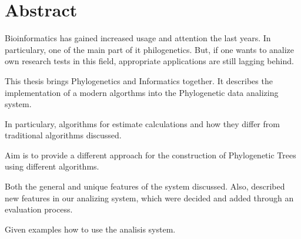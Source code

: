 \chapter*{Abstract} 
Bioinformatics has gained increased usage and attention the last years.
In particulary, one of the main part of it philogenetics. 
But, if one wants to analize own research tests in this field, appropriate applications 
are still lagging behind.

This thesis brings Phylogenetics and Informatics together. 
It describes the implementation of a modern algorthms
into the Phylogenetic data analizing system. 

In particulary, algorithms for estimate calculations \cite{kamilov} and how they
differ from traditional algorithms discussed.

Aim is to provide a different approach for the 
construction of Phylogenetic Trees using different algorithms.\cite{juravlyov}

Both the general and unique features of the system discussed. Also, 
described new features in our analizing system, which were decided 
and added through an evaluation process.

Given examples how to use the analisis system.\par

\vspace{10mm}


